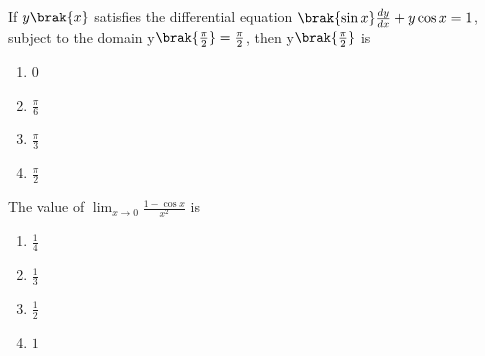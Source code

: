 \iffalse
\title{2021-ME-1-13}
\author{EE24BTECH11001 -  ADITYA TRIPATHY}
\section{me}
\chapter{2021}
\fi
    \item 
        If $y\brak{x}$ satisfies the differential equation $\brak{\sin x}\frac{dy}{dx} + y\cos x = 1$,
        subject to the domain y$\brak{\frac{\pi}{2}} = \frac{\pi}{2}$, then y$\brak{\frac{\pi}{2}}$
        is 
        \hfill{}
        \begin{multicols}{4}
            \begin{enumerate}
                \item 0
                    \columnbreak
                \item $\frac{\pi}{6}$
                    \columnbreak
                \item $\frac{\pi}{3}$
                    \columnbreak
                \item $\frac{\pi}{2}$
            \end{enumerate}
        \end{multicols}
    \item The value of $\lim_{x \rightarrow 0} \frac{1 - \cos x}{x^2}$ is
        \hfill{}
        \begin{multicols}{4}
            \begin{enumerate}
                \item $\frac{1}{4}$
                    \columnbreak
                \item $\frac{1}{3}$
                    \columnbreak
                \item $\frac{1}{2}$
                    \columnbreak
                \item $1$
            \end{enumerate}
        \end{multicols}

